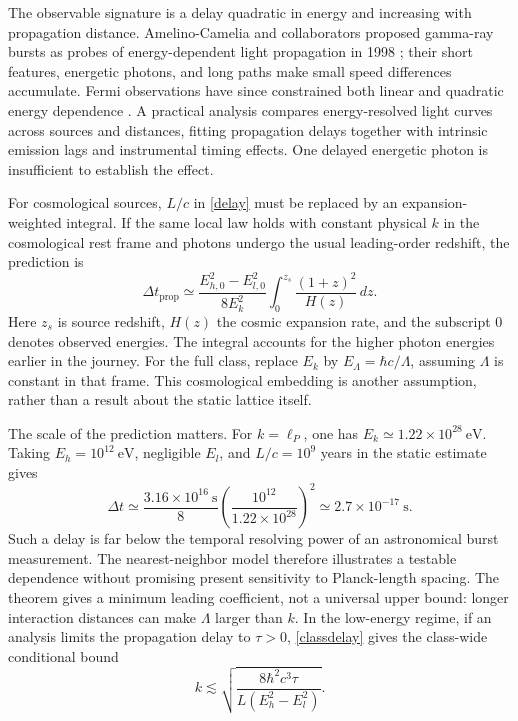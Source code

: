 \documentclass[11pt]{article}
\begin{document}
The observable signature is a delay quadratic in energy and increasing with propagation distance. Amelino-Camelia and collaborators proposed gamma-ray bursts as probes of energy-dependent light propagation in 1998 \cite{amelino}; their short features, energetic photons, and long paths make small speed differences accumulate. Fermi observations have since constrained both linear and quadratic energy dependence \cite{vasileiou}. A practical analysis compares energy-resolved light curves across sources and distances, fitting propagation delays together with intrinsic emission lags and instrumental timing effects. One delayed energetic photon is insufficient to establish the effect.

For cosmological sources, $L/c$ in \eqref{delay} must be replaced by an expansion-weighted integral. If the same local law holds with constant physical $k$ in the cosmological rest frame and photons undergo the usual leading-order redshift, the prediction is
\begin{equation}\label{cosmo}
\Delta t_{\mathrm{prop}}\simeq
\frac{E_{h,0}^2-E_{l,0}^2}{8E_k^2}
\int_0^{z_s}\frac{(1+z)^2}{H(z)}\,dz.
\end{equation}
Here $z_s$ is source redshift, $H(z)$ the cosmic expansion rate, and the subscript $0$ denotes observed energies. The integral accounts for the higher photon energies earlier in the journey. For the full class, replace $E_k$ by $E_\Lambda=\hbar c/\Lambda$, assuming $\Lambda$ is constant in that frame. This cosmological embedding is another assumption, rather than a result about the static lattice itself.

The scale of the prediction matters. For $k=\ell_P$, one has $E_k\simeq1.22\times10^{28}\ \mathrm{eV}$. Taking $E_h=10^{12}\ \mathrm{eV}$, negligible $E_l$, and $L/c=10^9$ years in the static estimate gives
\begin{equation}
\Delta t\simeq\frac{3.16\times10^{16}\ \mathrm{s}}{8}
\left(\frac{10^{12}}{1.22\times10^{28}}\right)^2
\simeq2.7\times10^{-17}\ \mathrm{s}.
\end{equation}
Such a delay is far below the temporal resolving power of an astronomical burst measurement. The nearest-neighbor model therefore illustrates a testable dependence without promising present sensitivity to Planck-length spacing. The theorem gives a minimum leading coefficient, not a universal upper bound: longer interaction distances can make $\Lambda$ larger than $k$. In the low-energy regime, if an analysis limits the propagation delay to $\tau>0$, \eqref{classdelay} gives the class-wide conditional bound
\begin{equation}
k\lesssim\sqrt{\frac{8\hbar^2c^3\tau}{L(E_h^2-E_l^2)}}.
\end{equation}
\end{document}
